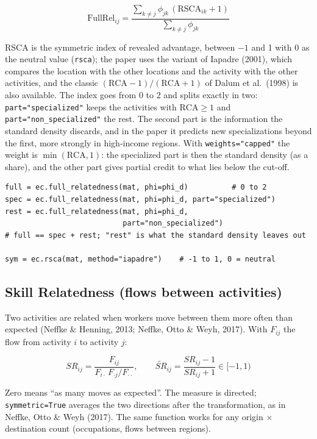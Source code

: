 \documentclass[12pt, a4paper]{article}
\newcommand{\fn}[1]{\texttt{#1}}
\begin{document}
\[
  \text{FullRel}_{ij} = \frac{\sum_{k \neq j} \phi_{jk}\,(\text{RSCA}_{ik} + 1)}
                             {\sum_{k \neq j} \phi_{jk}}
\]

\begin{sloppypar}
RSCA is the symmetric index of revealed advantage, between $-1$ and 1
with 0 as the neutral value (\fn{rsca}); the paper uses the variant of
Iapadre (2001), which compares the location with the other locations and
the activity with the other activities, and the classic
$(\text{RCA}-1)/(\text{RCA}+1)$ of Dalum et al.\ (1998) is also
available. The index goes from 0 to 2 and splits exactly in two:
\texttt{part="specialized"} keeps the activities with
$\text{RCA} \geq 1$ and \texttt{part="non\_specialized"} the rest. The
second part is the information the standard density discards, and in the
paper it predicts new specializations beyond the first, more strongly in
high-income regions. With \texttt{weights="capped"} the weight is
$\min(\text{RCA}, 1)$: the specialized part is then the standard density
(as a share), and the other part gives partial credit to what lies below
the cut-off.
\end{sloppypar}

\begin{lstlisting}[caption={Full relatedness and its two parts}]
full = ec.full_relatedness(mat, phi=phi_d)          # 0 to 2
spec = ec.full_relatedness(mat, phi=phi_d, part="specialized")
rest = ec.full_relatedness(mat, phi=phi_d,
                           part="non_specialized")
# full == spec + rest; "rest" is what the standard density leaves out

sym = ec.rsca(mat, method="iapadre")    # -1 to 1, 0 = neutral
\end{lstlisting}

\subsection{Skill Relatedness (flows between activities)}

Two activities are related when workers move between them more often
than expected (Neffke \& Henning, 2013; Neffke, Otto \& Weyh, 2017).
With $F_{ij}$ the flow from activity $i$ to activity $j$:

\[
  SR_{ij} = \frac{F_{ij}}{F_{i\cdot}\,F_{\cdot j} / F_{\cdot\cdot}},
  \qquad
  \widetilde{SR}_{ij} = \frac{SR_{ij} - 1}{SR_{ij} + 1} \in [-1, 1)
\]

Zero means ``as many moves as expected''. The measure is directed;
\texttt{symmetric=True} averages the two directions after the
transformation, as in Neffke, Otto \& Weyh (2017). The same function works for any origin $\times$
destination count (occupations, flows between regions).
\end{document}
